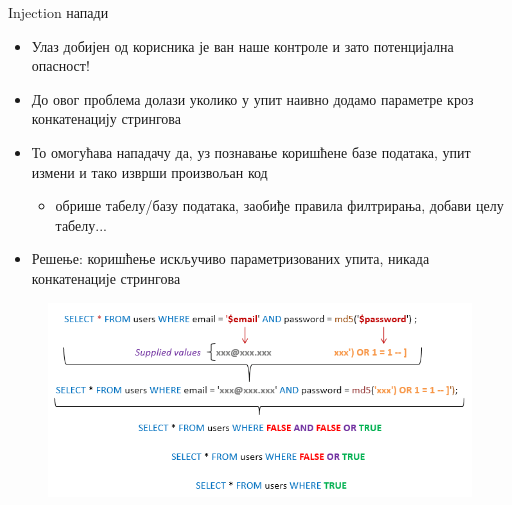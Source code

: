 \documentclass[aspectratio=169]{beamer}
\begin{document}
    \begin{frame}[allowframebreaks]{Injection напади}
        \begin{itemize}
            \item Улаз добијен од корисника је ван наше контроле и зато потенцијална опасност!
            \item До овог проблема долази уколико у упит наивно додамо параметре кроз конкатенацију стрингова
            \item То омогућава нападачу да, уз познавање коришћене базе података, упит измени и тако изврши произвољан код
            \begin{itemize}
                \item обрише табелу/базу података, заобиђе правила филтрирања, добави целу табелу...
            \end{itemize}
            \item Решење: коришћење искључиво параметризованих упита, никада конкатенације стрингова
        \end{itemize}
        
        \framebreak
        
        \begin{figure}
            \centering
            \includegraphics[width=\textwidth,height=0.7\textheight,keepaspectratio]{images/sqlinjection.png}
            \label{fig:sqlinjection}
        \end{figure}
    \end{frame}
    
\end{document}
